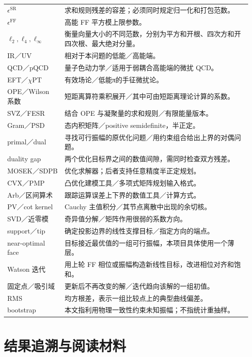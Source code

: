 \documentclass[UTF8,a4paper,11pt,fontset=fandol]{ctexart}
\numberwithin{equation}{section}
\newcommand{\eSR}{\epsilon^{\mathrm{SR}}}
\newcommand{\eFF}{\epsilon^{\mathrm{FF}}}
\newcommand{\newchapter}[1]{\FloatBarrier\Needspace{9\baselineskip}\section{#1}}
\begin{document}
\begin{longtable}{P{34mm}P{103mm}}
\(\eSR\) & 求和规则残差的容差；必须同时规定归一化和打包范数。\\
\(\eFF\) & 高能 FF 平方模上限参数。\\
\(\ell_2,\ell_4,\ell_\infty\) & 衡量向量大小的不同范数，分别为平方和开根、四次方和开四次根、最大绝对分量。\\
IR／UV & 相对于本问题的低能／高能端。\\
QCD／pQCD & 量子色动力学／适用于弱耦合高能端的微扰 QCD。\\
EFT／\(\chi\)PT & 有效场论／低能π的手征微扰论。\\
OPE／Wilson 系数 & 短距离算符乘积展开／其中可由短距离理论计算的系数。\\
SVZ／FESR & 结合 OPE 与凝聚量的求和规则／有限能量版本。\\
Gram／PSD & 态内积矩阵／positive semidefinite，半正定。\\
primal／dual & 寻找可行振幅的原优化问题／用约束组合给出上界的对偶问题。\\
duality gap & 两个优化目标界之间的数值间隙，需同时检查双方残差。\\
MOSEK／SDPB & 优化求解器；后者支持任意精度半正定规划。\\
CVX／PMP & 凸优化建模工具／多项式矩阵规划输入格式。\\
Arb／区间算术 & 跟踪运算误差上下界的数值工具／计算方式。\\
PV／cot kernel & Cauchy 主值积分／其节点离散中出现的余切核。\\
SVD／近零模 & 奇异值分解／矩阵作用很弱的系数方向。\\
support／tip & 确定投影边界的线性支撑目标／指定方向的端点。\\
near-optimal face & 目标接近最优值的一组可行振幅，本项目具体使用一个薄层。\\
Watson 迭代 & 用上轮 FF 相位或振幅构造新线性目标，改进相位对齐和饱和。\\
固定点／吸引域 & 更新后不再改变的解／迭代趋向该解的一组初值。\\
RMS & 均方根差，表示一组比较点上的典型曲线偏差。\\
bootstrap & 本文指利用物理一致性约束未知振幅；不指统计重抽样。\\
\end{longtable}
\normalsize

\newchapter{结果追溯与阅读材料}\label{app:sources}
\end{document}
